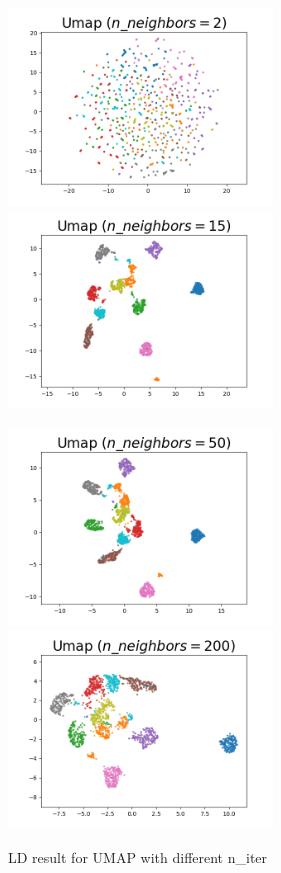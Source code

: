 \begin{figure}[H]
\centering  %
{
\label{Fig.sub.1}
\includegraphics[width=7cm,height=4cm\textwidth]{images/umap/umap_digit_n_neighbor_2.png}}
{
\label{Fig.sub.2}
\includegraphics[width=7cm,height=4cm\textwidth]{images/umap/umap_digit_n_neighbor_15.png}}

{
\label{Fig.sub.1}
\includegraphics[width=7cm,height=4cm\textwidth]{images/umap/umap_digit_n_neighbor_50.png}}
{
\label{Fig.sub.2}
\includegraphics[width=7cm,height=4cm\textwidth]{images/umap/umap_digit_n_neighbor_200.png}}
\caption{LD result for UMAP with different n\_iter}
\end{figure}

